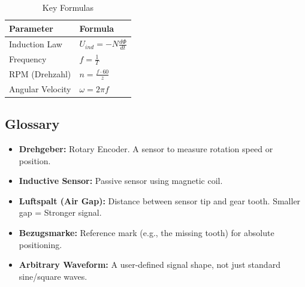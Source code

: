 \documentclass[a4paper,12pt]{article}
\begin{document}
\begin{table}[h]

    \centering

    \begin{tabular}{@{}ll@{}}

    \toprule

    \textbf{Parameter} & \textbf{Formula} \\ \midrule

    Induction Law & $U_{ind} = -N \frac{d\Phi}{dt}$ \\

    Frequency & $f = \frac{1}{T}$ \\

    RPM (Drehzahl) & $n = \frac{f \cdot 60}{z}$ \\

    Angular Velocity & $\omega = 2\pi f$ \\ \bottomrule

    \end{tabular}

    \caption{Key Formulas}

\end{table}



\subsection{Glossary}

\begin{itemize}

    \item \textbf{Drehgeber:} Rotary Encoder. A sensor to measure rotation speed or position.

    \item \textbf{Inductive Sensor:} Passive sensor using magnetic coil.

    \item \textbf{Luftspalt (Air Gap):} Distance between sensor tip and gear tooth. Smaller gap = Stronger signal.

    \item \textbf{Bezugsmarke:} Reference mark (e.g., the missing tooth) for absolute positioning.

    \item \textbf{Arbitrary Waveform:} A user-defined signal shape, not just standard sine/square waves.

\end{itemize}
\end{document}
